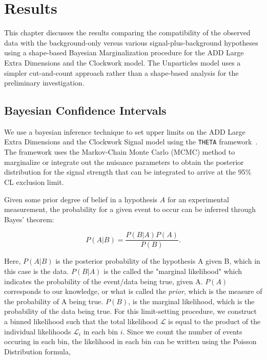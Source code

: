 \chapter{Results}\label{ch:results} 

This chapter discusses the results comparing the compatibility of the observed data with the background-only versus various signal-plus-background hypotheses using a shape-based Bayesian Marginalization procedure for the ADD Large Extra Dimensions and the Clockwork model. The Unparticles model uses a simpler cut-and-count approach rather than a shape-based analysis for the preliminary investigation.


\section{\label{sec:bayesian_inference} Bayesian Confidence Intervals}

We use a bayesian inference technique to set upper limits on the ADD Large Extra Dimensions and the Clockwork Signal model using the \texttt{THETA} framework~\cite{THETAFrameworkIntro}. The framework uses the Markov-Chain Monte Carlo (MCMC) method to marginalize or integrate out the nuisance parameters to obtain the posterior distribution for the signal strength that can be integrated to arrive at the 95\% CL exclusion limit.

Given some prior degree of belief in a hypothesis $A$ for an experimental measurement, the probability for a given event to occur can be inferred through Bayes' theorem:

\begin{equation} \label{eq:Bayestheorem}
P(A|B) = \frac{P(B|A)P(A)}{P(B)}.
\end{equation}

Here, $P(A|B)$ is the posterior probability of the hypothesis A given B, which in this case is the data. $P(B|A)$ is the called the "marginal likelihood" which indicates the probability of the event/data being true, given A. $P(A)$ corresponds to our knowledge, or what is called the \textit{prior}, which is the measure of the probability of A being true.  $P(B)$, is the marginal likelihood, which is the probability of the data being true. For this limit-setting procedure, we construct a binned likelihood such that the total likelihood $\mathcal{L}$ is equal to the product of the individual likelihoods $\mathcal{L}_{i}$ in each bin $i$. Since we count the number of events occuring in each bin, the likelihood in each bin can be written using the Poisson Distribution formula,

